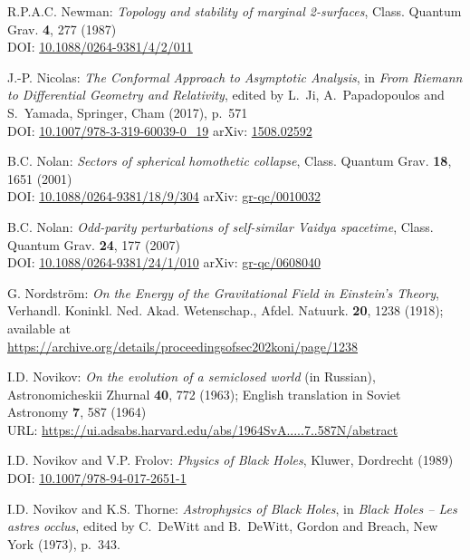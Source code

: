 \begin{thebibliography}{123}
R.P.A.C. Newman:
{\em Topology and stability of marginal 2-surfaces},
Class. Quantum Grav. {\bf 4}, 277 (1987)\\
DOI: \href{https://doi.org/10.1088/0264-9381/4/2/011}{10.1088/0264-9381/4/2/011}

J.-P. Nicolas:
{\em The Conformal Approach to Asymptotic Analysis},
in {\em From Riemann to Differential Geometry and Relativity},
edited by L.~Ji, A.~Papadopoulos and S.~Yamada, Springer, Cham (2017), p.~571\\
DOI: \href{https://doi.org/10.1007/978-3-319-60039-0_19}{10.1007/978-3-319-60039-0\_19}\hfill
arXiv: \href{https://arxiv.org/abs/1508.02592}{1508.02592}

B.C. Nolan:
{\em Sectors of spherical homothetic collapse},
Class. Quantum Grav. {\bf 18}, 1651 (2001)\\
DOI: \href{https://doi.org/10.1088/0264-9381/18/9/304}{10.1088/0264-9381/18/9/304}\hfill
arXiv: \href{https://arxiv.org/abs/gr-qc/0010032}{gr-qc/0010032}

B.C. Nolan:
{\em Odd-parity perturbations of self-similar Vaidya spacetime},
Class. Quantum Grav. {\bf 24}, 177 (2007)\\
DOI: \href{https://doi.org/10.1088/0264-9381/24/1/010}{10.1088/0264-9381/24/1/010}\hfill
arXiv: \href{https://arxiv.org/abs/gr-qc/0608040}{gr-qc/0608040}

G. Nordström:
{\em On the Energy of the Gravitational Field in Einstein's Theory},
Verhandl. Koninkl. Ned. Akad. Wetenschap., Afdel. Natuurk. {\bf 20}, 1238 (1918);
available at\\
\url{https://archive.org/details/proceedingsofsec202koni/page/1238}

I.D. Novikov:
{\em On the evolution of a semiclosed world} (in Russian),
Astronomicheskii Zhurnal {\bf 40}, 772 (1963); English translation in
Soviet Astronomy {\bf 7}, 587 (1964)\\
URL: \url{https://ui.adsabs.harvard.edu/abs/1964SvA.....7..587N/abstract}

I.D. Novikov and V.P. Frolov: {\em Physics of Black Holes},
Kluwer, Dordrecht (1989)\\
DOI: \href{https://doi.org/10.1007/978-94-017-2651-1}{10.1007/978-94-017-2651-1}

I.D. Novikov and K.S. Thorne: {\em Astrophysics of Black Holes},
in {\em Black Holes -- Les astres occlus},  edited by C.~DeWitt and B.~DeWitt,
Gordon and Breach, New York (1973), p.~343.


\end{thebibliography}
